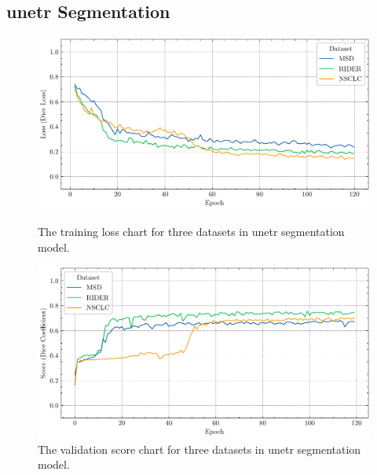 \documentclass[11pt,times,oneside,openright]{eeereport}
\begin{document}
\begin{appendices}
\section{\acrshort{unetr} Segmentation}
\begin{figure}[!htb]
   \begin{minipage}{0.48\textwidth}
     \centering
     \includegraphics[width=\linewidth]{fig/result/unetr_train.pdf}
     \caption{The training loss chart for three datasets in \acrshort{unetr} segmentation model.}\label{fig:app_unetr_train}
   \end{minipage}\hfill
   \begin{minipage}{0.48\textwidth}
     \centering
     \includegraphics[width=\linewidth]{fig/result/unetr_val.pdf}
     \caption{The validation score chart for three datasets in \acrshort{unetr} segmentation model.
}\label{fig:app_unetr_val}
   \end{minipage}
\end{figure}

\clearpage


\end{appendices}
\end{document}
